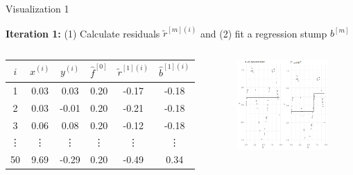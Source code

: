 \begin{vbframe}{Visualization 1}
\begin{footnotesize}
\end{footnotesize}

\framebreak
\begin{footnotesize}
\textbf{Iteration 1:} (1) Calculate residuals $\tilde{r}^{[m](i)}$ and (2) fit a regression stump $b^{[m]}$ %

\begin{columns}

\column{5cm}
\begin{center}
\begin{tabular}{c|c|c|c|c|c}
$i$ & $x^{(i)}$ & $y^{(i)}$ & $\hat{f}^{[0]}$ & $\tilde{r}^{[1](i)}$ & $\hat{b}^{[1](i)}$\\ \hline
1 & 0.03 &  0.03 & 0.20 & -0.17 & -0.18\\
2 & 0.03 & -0.01 & 0.20 & -0.21 & -0.18 \\
3 & 0.06 &  0.08 & 0.20 & -0.12 & -0.18 \\
\vdots & \vdots & \vdots & \vdots  & \vdots & \vdots \\
50 & 9.69 & -0.29 & 0.20 & -0.49 & 0.34\\
\end{tabular}
\end{center}

\column{4.9cm}
\begin{figure}
  \includegraphics[width=\textwidth]{figure_man/gbm_anim_01.png}
\end{figure}


\end{columns}
\end{footnotesize}
\end{vbframe}
